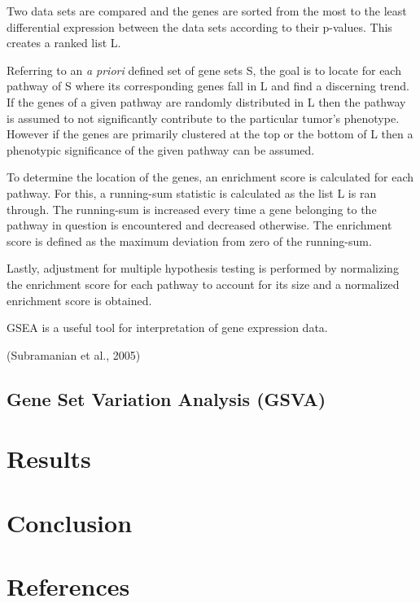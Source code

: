 \documentclass[
]{article}
\begin{document}
Two data sets are compared and the genes are sorted from the most to the
least differential expression between the data sets according to their
p-values. This creates a ranked list L.

Referring to an \emph{a priori} defined set of gene sets S, the goal is
to locate for each pathway of S where its corresponding genes fall in L
and find a discerning trend. If the genes of a given pathway are
randomly distributed in L then the pathway is assumed to not
significantly contribute to the particular tumor's phenotype. However if
the genes are primarily clustered at the top or the bottom of L then a
phenotypic significance of the given pathway can be assumed.

To determine the location of the genes, an enrichment score is
calculated for each pathway. For this, a running-sum statistic is
calculated as the list L is ran through. The running-sum is increased
every time a gene belonging to the pathway in question is encountered
and decreased otherwise. The enrichment score is defined as the maximum
deviation from zero of the running-sum.

Lastly, adjustment for multiple hypothesis testing is performed by
normalizing the enrichment score for each pathway to account for its
size and a normalized enrichment score is obtained.

GSEA is a useful tool for interpretation of gene expression data.

(Subramanian et al., 2005)

\hypertarget{gene-set-variation-analysis-gsva}{%
\subsection{Gene Set Variation Analysis
(GSVA)}\label{gene-set-variation-analysis-gsva}}

\hypertarget{results}{%
\section{Results}\label{results}}

\hypertarget{conclusion}{%
\section{Conclusion}\label{conclusion}}

\hypertarget{references}{%
\section*{References}\label{references}}
\end{document}
